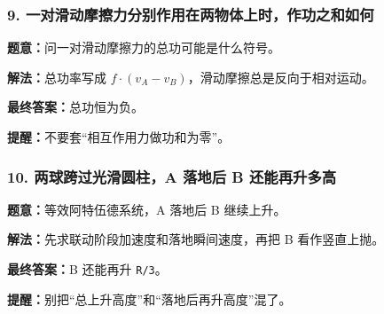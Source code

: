 \documentclass[12pt,a4paper]{ctexart}
\begin{document}
\subsubsection*{9. 一对滑动摩擦力分别作用在两物体上时，作功之和如何}
\begin{tcolorbox}[colback=gray!2!white,colframe=black!60,title={题目}]
\textbf{题意：}问一对滑动摩擦力的总功可能是什么符号。\par
\end{tcolorbox}
\begin{tcolorbox}[colback=blue!2!white,colframe=blue!55!black,title={完整答案}]
\textbf{解法：}总功率写成 \(f·(v_A-v_B)\)，滑动摩擦总是反向于相对运动。\par
\textbf{最终答案：}总功恒为负。\par

\end{tcolorbox}
\begin{tcolorbox}[colback=red!2!white,colframe=red!55!black,title={易错点}]
\textbf{提醒：}不要套“相互作用力做功和为零”。\par
\end{tcolorbox}

\subsubsection*{10. 两球跨过光滑圆柱，A 落地后 B 还能再升多高}
\begin{tcolorbox}[colback=gray!2!white,colframe=black!60,title={题目}]
\textbf{题意：}等效阿特伍德系统，A 落地后 B 继续上升。\par
\end{tcolorbox}
\begin{tcolorbox}[colback=blue!2!white,colframe=blue!55!black,title={完整答案}]
\textbf{解法：}先求联动阶段加速度和落地瞬间速度，再把 B 看作竖直上抛。\par
\textbf{最终答案：}B 还能再升 \texttt{R/3}。\par

\end{tcolorbox}
\begin{tcolorbox}[colback=red!2!white,colframe=red!55!black,title={易错点}]
\textbf{提醒：}别把“总上升高度”和“落地后再升高度”混了。\par
\end{tcolorbox}
\end{document}
